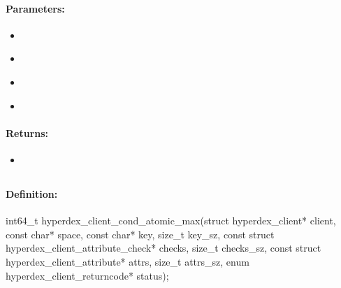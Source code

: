 \paragraph{Parameters:}
\begin{itemize}[noitemsep]
\item {}\\

\item {}\\

\item {}\\

\item {}\\

\end{itemize}

\paragraph{Returns:}
\begin{itemize}[noitemsep]
\item {}\\

\end{itemize}

\pagebreak
\subsection{}
\label{api:c:cond_atomic_max}


\paragraph{Definition:}
\begin{ccode}
int64_t hyperdex_client_cond_atomic_max(struct hyperdex_client* client,
        const char* space,
        const char* key, size_t key_sz,
        const struct hyperdex_client_attribute_check* checks, size_t checks_sz,
        const struct hyperdex_client_attribute* attrs, size_t attrs_sz,
        enum hyperdex_client_returncode* status);
\end{ccode}

